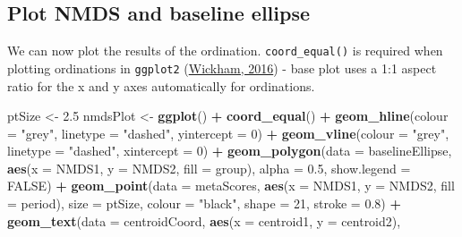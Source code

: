 \documentclass[nofonts,]{tufte-handout}
\newenvironment{Shaded}{\begin{snugshade}}{\end{snugshade}}
\newcommand{\AttributeTok}[1]{\textcolor[rgb]{0.13,0.29,0.53}{#1}}
\newcommand{\ConstantTok}[1]{\textcolor[rgb]{0.56,0.35,0.01}{#1}}
\newcommand{\DecValTok}[1]{\textcolor[rgb]{0.00,0.00,0.81}{#1}}
\newcommand{\FloatTok}[1]{\textcolor[rgb]{0.00,0.00,0.81}{#1}}
\newcommand{\FunctionTok}[1]{\textcolor[rgb]{0.13,0.29,0.53}{\textbf{#1}}}
\newcommand{\NormalTok}[1]{#1}
\newcommand{\OtherTok}[1]{\textcolor[rgb]{0.56,0.35,0.01}{#1}}
\newcommand{\SpecialCharTok}[1]{\textcolor[rgb]{0.81,0.36,0.00}{\textbf{#1}}}
\newcommand{\StringTok}[1]{\textcolor[rgb]{0.31,0.60,0.02}{#1}}
\begin{document}
\hypertarget{plot-nmds-and-baseline-ellipse}{%
\subsection{Plot NMDS and baseline
ellipse}\label{plot-nmds-and-baseline-ellipse}}

We can now plot the results of the ordination. \texttt{coord\_equal()}
is required when plotting ordinations in \texttt{ggplot2}
(\protect\hyperlink{ref-wickham_2016_ggplot2}{Wickham, 2016}) - base
plot uses a 1:1 aspect ratio for the x and y axes automatically for
ordinations.

\begin{Shaded}
\begin{Highlighting}[]
\NormalTok{ptSize }\OtherTok{\textless{}{-}} \FloatTok{2.5}
\NormalTok{nmdsPlot }\OtherTok{\textless{}{-}} \FunctionTok{ggplot}\NormalTok{() }\SpecialCharTok{+} 
  \FunctionTok{coord\_equal}\NormalTok{() }\SpecialCharTok{+} 
  \FunctionTok{geom\_hline}\NormalTok{(}\AttributeTok{colour =} \StringTok{"grey"}\NormalTok{, }\AttributeTok{linetype =} \StringTok{"dashed"}\NormalTok{, }
             \AttributeTok{yintercept =} \DecValTok{0}\NormalTok{) }\SpecialCharTok{+}
  \FunctionTok{geom\_vline}\NormalTok{(}\AttributeTok{colour =} \StringTok{"grey"}\NormalTok{, }\AttributeTok{linetype =} \StringTok{"dashed"}\NormalTok{, }
             \AttributeTok{xintercept =} \DecValTok{0}\NormalTok{) }\SpecialCharTok{+}
  \FunctionTok{geom\_polygon}\NormalTok{(}\AttributeTok{data =}\NormalTok{ baselineEllipse, }
               \FunctionTok{aes}\NormalTok{(}\AttributeTok{x =}\NormalTok{ NMDS1, }\AttributeTok{y =}\NormalTok{ NMDS2,}
                   \AttributeTok{fill =}\NormalTok{ group),}
               \AttributeTok{alpha =} \FloatTok{0.5}\NormalTok{, }\AttributeTok{show.legend =} \ConstantTok{FALSE}\NormalTok{) }\SpecialCharTok{+}
  \FunctionTok{geom\_point}\NormalTok{(}\AttributeTok{data =}\NormalTok{ metaScores, }
             \FunctionTok{aes}\NormalTok{(}\AttributeTok{x =}\NormalTok{ NMDS1, }\AttributeTok{y =}\NormalTok{ NMDS2,}
                 \AttributeTok{fill =}\NormalTok{ period),}
             \AttributeTok{size =}\NormalTok{ ptSize, }\AttributeTok{colour =} \StringTok{"black"}\NormalTok{, }\AttributeTok{shape =} \DecValTok{21}\NormalTok{,}
             \AttributeTok{stroke =} \FloatTok{0.8}\NormalTok{) }\SpecialCharTok{+}
    \FunctionTok{geom\_text}\NormalTok{(}\AttributeTok{data =}\NormalTok{ centroidCoord, }
            \FunctionTok{aes}\NormalTok{(}\AttributeTok{x =}\NormalTok{ centroid1, }\AttributeTok{y =}\NormalTok{ centroid2), }

\end{Highlighting}
\end{Shaded}
\end{document}
